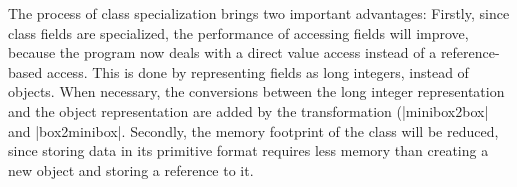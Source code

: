 The process of class specialization brings two important advantages: Firstly, since class fields are specialized, the performance of accessing fields will improve, because the program now deals with a direct value access instead of a reference-based access. This is done by representing fields as long integers, instead of objects. When necessary, the conversions between the long integer representation and the object representation are added by the transformation (|minibox2box| and |box2minibox|. Secondly, the memory footprint of the class will be reduced, since storing data in its primitive format requires less memory than creating a new object and storing a reference to it.

